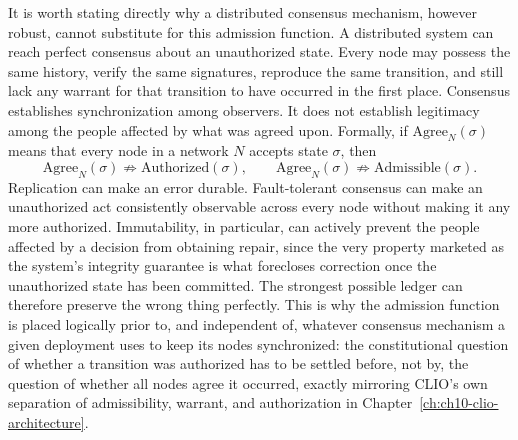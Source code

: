 It is worth stating directly why a distributed consensus mechanism, however robust, cannot substitute for this admission function. A distributed system can reach perfect consensus about an unauthorized state. Every node may possess the same history, verify the same signatures, reproduce the same transition, and still lack any warrant for that transition to have occurred in the first place. Consensus establishes synchronization among observers. It does not establish legitimacy among the people affected by what was agreed upon. Formally, if $\mathrm{Agree}_N(\sigma)$ means that every node in a network $N$ accepts state $\sigma$, then
\[
\mathrm{Agree}_N(\sigma) \not\Rightarrow \mathrm{Authorized}(\sigma), \qquad \mathrm{Agree}_N(\sigma) \not\Rightarrow \mathrm{Admissible}(\sigma).
\]
Replication can make an error durable. Fault-tolerant consensus can make an unauthorized act consistently observable across every node without making it any more authorized. Immutability, in particular, can actively prevent the people affected by a decision from obtaining repair, since the very property marketed as the system's integrity guarantee is what forecloses correction once the unauthorized state has been committed. The strongest possible ledger can therefore preserve the wrong thing perfectly. This is why the admission function is placed logically prior to, and independent of, whatever consensus mechanism a given deployment uses to keep its nodes synchronized: the constitutional question of whether a transition was authorized has to be settled before, not by, the question of whether all nodes agree it occurred, exactly mirroring CLIO's own separation of admissibility, warrant, and authorization in Chapter~\ref{ch:ch10-clio-architecture}.
